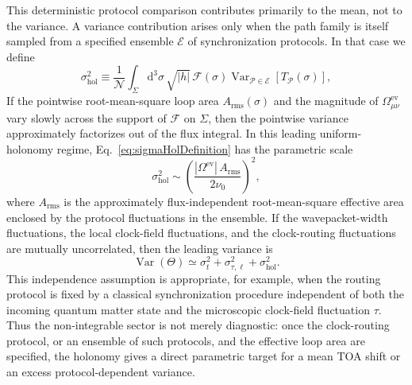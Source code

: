 \documentclass[pdflatex,sn-mathphys-num]{sn-jnl}
\theoremstyle{thmstylethree}
\theoremstyle{thmstyleone}
\theoremstyle{thmstyletwo}
\numberwithin{equation}{section}
\newcommand{\dd}{\mathrm{d}}
\begin{document}
            This deterministic protocol comparison contributes primarily to the mean, not to the variance.
            A variance contribution arises only when the path family is itself sampled from a specified ensemble $\mathcal{E}$ of synchronization protocols. In that case we define
            \begin{equation}
                \sigma_{\mathrm{hol}}^2
                \equiv
                \frac{1}{\mathcal{N}}
                \int_{\Sigma}\dd^3\sigma\,\sqrt{|h|}\,
                \mathcal{F}(\sigma)
                \operatorname{Var}_{\mathcal{P}\in\mathcal{E}}
                \!\left[T_{\mathcal{P}}(\sigma)\right],
                \label{eq:sigmaHolDefinition}
            \end{equation}
            If the pointwise root-mean-square loop area $A_{\mathrm{rms}}(\sigma)$ and the magnitude of $\Omega^{\mathrm{ev}}_{\mu\nu}$ vary slowly across the support of $\mathcal{F}$ on $\Sigma$, then the pointwise variance approximately factorizes out of the flux integral. In this leading uniform-holonomy regime, Eq.~\eqref{eq:sigmaHolDefinition} has the parametric scale
            \begin{equation}
                \sigma_{\mathrm{hol}}^2
                \sim
                \left(\frac{|\Omega^{\mathrm{ev}}|\,A_{\mathrm{rms}}}{2\nu_0}\right)^2,
                \label{eq:sigmaHolEstimate}
            \end{equation}
            where $A_{\mathrm{rms}}$ is the approximately flux-independent root-mean-square effective area enclosed by the protocol fluctuations in the ensemble.
            If the wavepacket-width fluctuations, the local clock-field fluctuations, and the clock-routing fluctuations are mutually uncorrelated, then the leading variance is
            \begin{equation}
                \operatorname{Var}(\Theta)
                \simeq
                \sigma_t^2+\sigma_{\tau,\ell}^2+\sigma_{\mathrm{hol}}^2.
                \label{eq:holonomyVariance}
            \end{equation}
            This independence assumption is appropriate, for example, when the routing protocol is fixed by a classical synchronization procedure independent of both the incoming quantum matter state and the microscopic clock-field fluctuation $\tau$. Thus the non-integrable sector is not merely diagnostic: once the clock-routing protocol, or an ensemble of such protocols, and the effective loop area are specified, the holonomy gives a direct parametric target for a mean TOA shift or an excess protocol-dependent variance.
\end{document}
